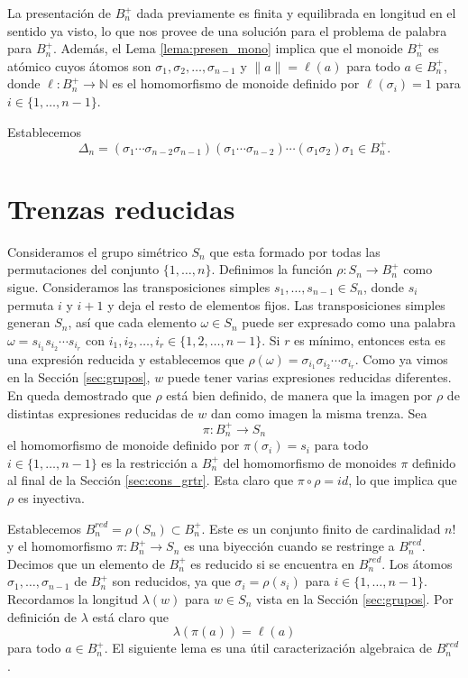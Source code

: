 \documentclass[12pt]{book}
\theoremstyle{definition}
\providecommand{\norm}[1]{\lVert#1\rVert}
\begin{document}
La presentación de $B_n^+$ dada previamente es finita y equilibrada en longitud en el sentido ya visto, lo que nos provee de una solución para el problema de palabra para $B_n^+$. Además, el Lema \ref{lema:presen_mono} implica que el monoide $B_n^+$ es atómico cuyos átomos son $\sigma_1,\sigma_2,\ldots,\sigma_{n-1}$ y $\norm{a}=\ell(a)$ para todo $a\in B_n^+$, donde $\ell : B_n^+\rightarrow \mathbb{N}$ es el homomorfismo de monoide definido por $\ell(\sigma_i)=1$ para $i\in\{1,\ldots,n-1\}$.

Establecemos
$$\Delta_n = (\sigma_1\cdots\sigma_{n-2}\sigma_{n-1})(\sigma_1\cdots\sigma_{n-2})\cdots(\sigma_1\sigma_2)\sigma_1\in B_n^+.$$

\section{Trenzas reducidas}

Consideramos el grupo simétrico $S_n$ que esta formado por todas las permutaciones del conjunto $\{1,\ldots,n\}$. Definimos la función $\rho:S_n\rightarrow B_n^+$ como sigue. Consideramos las transposiciones simples $s_1,\ldots,s_{n-1}\in S_n$, donde $s_i$ permuta $i$ y $i+1$ y deja el resto de elementos fijos. Las transposiciones simples generan $S_n$, así que cada elemento $\omega\in S_n$ puede ser expresado como una palabra $\omega = s_{i_1}s_{i_2}\cdots s_{i_r}$ con $i_1,i_2,\ldots,i_r\in\{1,2,\ldots,n-1\}$. Si $r$ es mínimo, entonces esta es una expresión reducida y establecemos que $\rho(\omega)=\sigma_{i_1}\sigma_{i_2}\cdots \sigma_{i_r}$. Como ya vimos en la Sección \ref{sec:grupos}, $w$ puede tener varias expresiones reducidas diferentes. En \cite{br_gr} queda demostrado que $\rho$ está bien definido, de manera que la imagen por $\rho$ de distintas expresiones reducidas de $w$ dan como imagen la misma trenza. Sea
$$\pi:B_n^+\rightarrow S_n$$
el homomorfismo de monoide definido por $\pi(\sigma_i)=s_i$ para todo $i\in\{1,\ldots,n-1\}$ es la restricción a $B_n^+$ del homomorfismo de monoides $\pi$ definido al final de la Sección \ref{sec:cons_grtr}. Esta claro que $\pi\circ\rho = id$, lo que implica que $\rho$ es inyectiva.

Establecemos $B_n^{red}=\rho(S_n)\subset B_n^+$. Este es un conjunto finito de cardinalidad $n!$ y el homomorfismo $\pi:B_n^+\rightarrow S_n$ es una biyección cuando se restringe a $B_n^{red}$. Decimos que un elemento de $B_n^+$ es reducido si se encuentra en $B_n^{red}$. Los átomos $\sigma_1,\ldots,\sigma_{n-1}$ de $B_n^+$ son reducidos, ya que $\sigma_i=\rho(s_i)$ para $i\in\{1,\ldots,n-1\}$. Recordamos la longitud $\lambda(w)$ para $w\in S_n$ vista en la Sección \ref{sec:grupos}. Por definición de $\lambda$ está claro que
$$\lambda(\pi(a))=\ell(a)$$
para todo $a\in B_n^+$. El siguiente lema es una útil caracterización algebraica de $B_n^{red}$.
\end{document}
